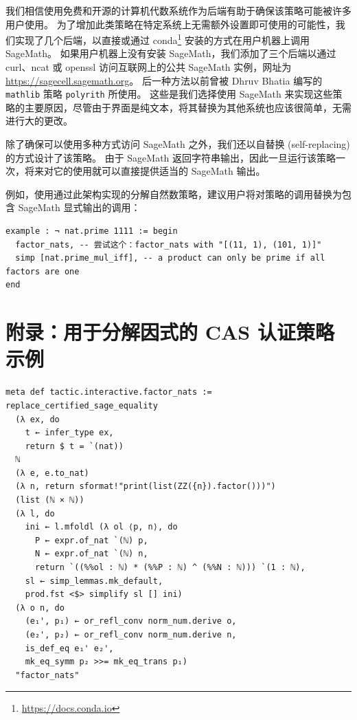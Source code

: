 \documentclass[sigplan,10pt,nonacm,
screen]{acmart} \settopmatter{printfolios=true,printccs=false,printacmref=false}
\newcommand{\mathlib}{\lstinline{mathlib}\xspace}
\begin{document}
我们相信使用免费和开源的计算机代数系统作为后端有助于确保该策略可能被许多用户使用。
为了增加此类策略在特定系统上无需额外设置即可使用的可能性，我们实现了几个后端，以直接或通过 conda\footnote{\url{https://docs.conda.io}} 安装的方式在用户机器上调用 SageMath。
如果用户机器上没有安装 SageMath，我们添加了三个后端以通过 curl、ncat 或 openssl 访问互联网上的公共 SageMath 实例，网址为 \url{https://sagecell.sagemath.org}。
后一种方法以前曾被 Dhruv Bhatia 编写的 \mathlib 策略 \lstinline{polyrith} 所使用。
这些是我们选择使用 SageMath 来实现这些策略的主要原因，尽管由于界面是纯文本，将其替换为其他系统也应该很简单，无需进行大的更改。

除了确保可以使用多种方式访问 SageMath 之外，我们还以自替换 (self-replacing) 的方式设计了该策略。
由于 SageMath 返回字符串输出，因此一旦运行该策略一次，将来对它的使用就可以直接提供适当的 SageMath 输出。

例如，使用通过此架构实现的分解自然数策略，建议用户将对策略的调用替换为包含 SageMath 显式输出的调用：
\begin{lstlisting}
example : ¬ nat.prime 1111 := begin
  factor_nats, -- 尝试这个：factor_nats with "[(11, 1), (101, 1)]"
  simp [nat.prime_mul_iff], -- a product can only be prime if all factors are one
end
\end{lstlisting}

\section{附录：用于分解因式的 CAS 认证策略示例}
\label{app:factor_nats}
\begin{lstlisting}
meta def tactic.interactive.factor_nats := replace_certified_sage_equality
  (λ ex, do
    t ← infer_type ex,
    return $ t = `(nat))
  ℕ
  (λ e, e.to_nat)
  (λ n, return sformat!"print(list(ZZ({n}).factor()))")
  (list (ℕ × ℕ))
  (λ l, do
    ini ← l.mfoldl (λ ol ⟨p, n⟩, do
      P ← expr.of_nat `(ℕ) p,
      N ← expr.of_nat `(ℕ) n,
      return `((%%ol : ℕ) * (%%P : ℕ) ^ (%%N : ℕ))) `(1 : ℕ),
    sl ← simp_lemmas.mk_default,
    prod.fst <$> simplify sl [] ini)
  (λ o n, do
    (e₁', p₁) ← or_refl_conv norm_num.derive o,
    (e₂', p₂) ← or_refl_conv norm_num.derive n,
    is_def_eq e₁' e₂',
    mk_eq_symm p₂ >>= mk_eq_trans p₁)
  "factor_nats"
\end{lstlisting}




\end{document}
